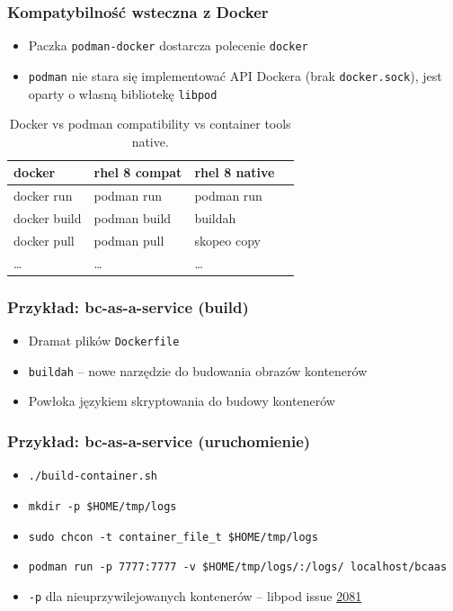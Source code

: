 \documentclass[dvipsnames,table]{beamer}
\begin{document}
\begin{frame}
	\frametitle{Kompatybilność wsteczna z Docker}
	\begin{itemize}
		\item Paczka {\tt podman-docker} dostarcza polecenie {\tt docker}
		\item {\tt podman} nie stara się implementować API Dockera (brak {\tt docker.sock}), jest oparty o własną bibliotekę {\tt libpod}
	\end{itemize}
\centering
	\begin{table}
\caption{Docker vs podman compatibility vs container tools native.}
\label{porownanie}
\scriptsize
\begin{tabular}{llll}
\hline
docker & rhel 8 compat & rhel 8 native   \\ \hline
	docker run & podman run & podman run \\
	docker build & podman build & buildah  \\
	docker pull & podman pull & skopeo copy \\ 
	\ldots & \ldots & \ldots \\ \hline
\end{tabular}
\normalsize
\end{table}
\end{frame}

\begin{frame}[fragile]
	\frametitle{Przykład: bc-as-a-service (build)}
\begin{itemize}
	\item Dramat plików {\tt Dockerfile}
	\item {\tt buildah} -- nowe narzędzie do budowania obrazów kontenerów
	\item Powłoka językiem skryptowania do budowy kontenerów
\end{itemize}

\end{frame}

\begin{frame}
	\frametitle{Przykład: bc-as-a-service (uruchomienie)}
	\begin{itemize}
		\item {\tt ./build-container.sh}
		\item {\tt mkdir -p \$HOME/tmp/logs}
		\item {\tt sudo chcon -t container\_file\_t \$HOME/tmp/logs}
		\item {\tt podman run -p 7777:7777 -v \$HOME/tmp/logs/:/logs/ localhost/bcaas}
		\item {\tt -p} dla nieuprzywilejowanych kontenerów -- libpod issue \href{https://github.com/containers/libpod/issues/2081}{2081}
	\end{itemize}
\end{frame}
\end{document}
